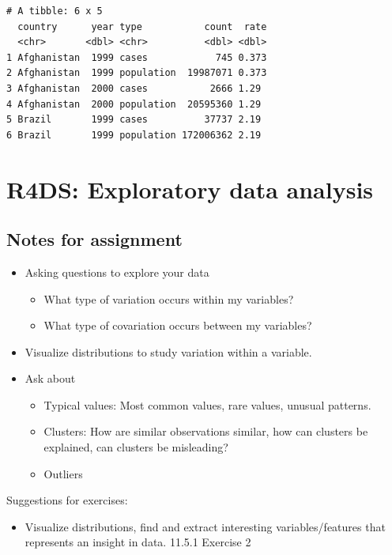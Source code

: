 \documentclass[
  letterpaper,
  DIV=11,
  numbers=noendperiod]{scrreprt}
\providecommand{\tightlist}{%
  \setlength{\itemsep}{0pt}\setlength{\parskip}{0pt}}\usepackage{longtable,booktabs,array}
\begin{document}
\begin{verbatim}
# A tibble: 6 x 5
  country      year type           count  rate
  <chr>       <dbl> <chr>          <dbl> <dbl>
1 Afghanistan  1999 cases            745 0.373
2 Afghanistan  1999 population  19987071 0.373
3 Afghanistan  2000 cases           2666 1.29 
4 Afghanistan  2000 population  20595360 1.29 
5 Brazil       1999 cases          37737 2.19 
6 Brazil       1999 population 172006362 2.19 
\end{verbatim}

\chapter{R4DS: Exploratory data
analysis}\label{r4ds-exploratory-data-analysis}

\section{Notes for assignment}\label{notes-for-assignment}

\begin{itemize}
\tightlist
\item
  Asking questions to explore your data

  \begin{itemize}
  \tightlist
  \item
    What type of variation occurs within my variables?
  \item
    What type of covariation occurs between my variables?
  \end{itemize}
\item
  Visualize distributions to study variation within a variable.
\item
  Ask about

  \begin{itemize}
  \tightlist
  \item
    Typical values: Most common values, rare values, unusual patterns.
  \item
    Clusters: How are similar observations similar, how can clusters be
    explained, can clusters be misleading?
  \item
    Outliers
  \end{itemize}
\end{itemize}

Suggestions for exercises:

\begin{itemize}
\tightlist
\item
  Visualize distributions, find and extract interesting
  variables/features that represents an insight in data. 11.5.1 Exercise
  2
\end{itemize}
\end{document}
